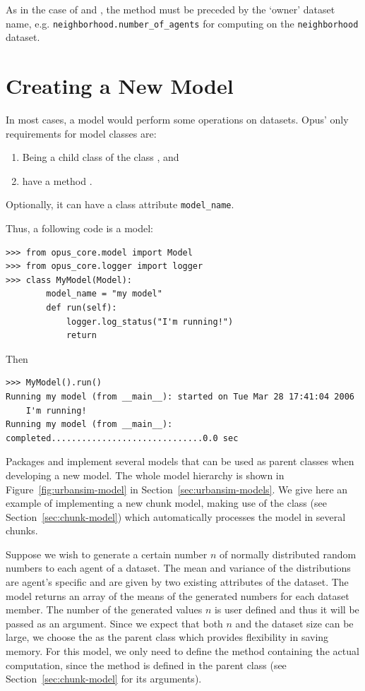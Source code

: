 As in the case of  and , the
 method must be preceded by the `owner' dataset
name, e.g. \verb|neighborhood.number_of_agents| for computing on the
\verb|neighborhood| dataset.

%
\section{Creating a New Model}
%
In most cases, a model would perform some operations on datasets. \datasetindex Opus' only
requirements for model classes are:
\begin{enumerate}
\item Being a child class of the  class , and
\item have a method .
\end{enumerate}
Optionally, it can have a class attribute \attributesindex \verb|model_name|.

Thus, a following code is a model:
\begin{verbatim}
>>> from opus_core.model import Model
>>> from opus_core.logger import logger
>>> class MyModel(Model):
        model_name = "my model"
        def run(self):
            logger.log_status("I'm running!")
            return
\end{verbatim}
Then
\begin{verbatim}
>>> MyModel().run()
Running my model (from __main__): started on Tue Mar 28 17:41:04 2006
    I'm running!
Running my model (from __main__): completed..............................0.0 sec
\end{verbatim}

Packages  and  implement several models that can be used
as parent classes when developing a new model. The whole model hierarchy is shown in
Figure~\ref{fig:urbansim-model} in Section~\ref{sec:urbansim-models}.
We give here an example of implementing a new chunk model, making use of the 
class  (see Section~\ref{sec:chunk-model}) which automatically
processes the model in several chunks.

Suppose we wish to generate a certain number $n$ of normally distributed random numbers
to each agent of a dataset. \datasetindex The mean and variance of the distributions are agent's specific and are
given by two existing attributes \attributesindex of the dataset. \datasetindex
The model returns an array of the means of the generated numbers
for each dataset \datasetindex member. The number of the generated values $n$ is user defined \variablesindex and thus it will be
passed as an argument. Since we expect that both $n$ and the dataset \datasetindex size can be large, we choose
the  as the parent class which provides flexibility in saving memory. For this model,
we only need to define the method  containing the actual computation,
since the  method is defined
in the parent class (see Section~\ref{sec:chunk-model} for its arguments).

